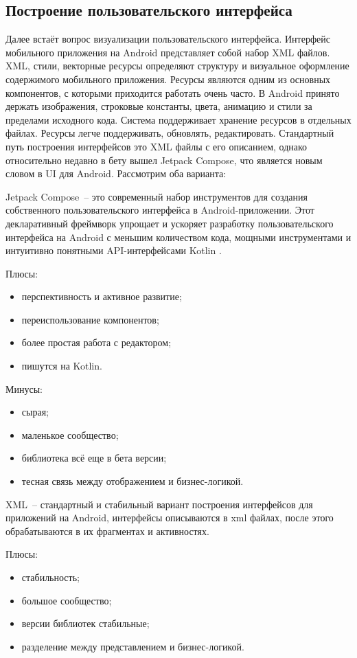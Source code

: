 \subsection{Построение пользовательского интерфейса}
Далее встаёт вопрос визуализации пользовательского интерфейса. Интерфейс мобильного приложения на Android представляет собой набор XML файлов. 
XML, стили, векторные ресурсы определяют структуру и визуальное оформление содержимого мобильного приложения. Ресурсы являются одним из основных компонентов, с которыми приходится работать очень часто. В Android принято держать изображения, строковые константы, цвета, анимацию и стили за пределами исходного кода. Система поддерживает хранение ресурсов в отдельных файлах. Ресурсы легче поддерживать, обновлять, редактировать. Стандартный путь построения интерфейсов это XML файлы с его описанием, однако относительно недавно в бету вышел Jetpack Compose, что является новым словом в UI для Android. Рассмотрим оба варианта:

Jetpack Compose~-- это современный набор инструментов для создания собственного пользовательского интерфейса в Android-приложении. Этот декларативный фреймворк упрощает и ускоряет разработку пользовательского интерфейса на Android с меньшим количеством кода, мощными инструментами и интуитивно понятными API-интерфейсами Kotlin \cite{web13}.
 
Плюсы:
\begin{itemize}
 \item перспективность и активное развитие;
 \item переиспользование компонентов;
 \item более простая работа с редактором;
 \item пишутся на Kotlin.
\end{itemize}

Минусы:
\begin{itemize}
 \item сырая;
 \item маленькое сообщество;
 \item библиотека всё еще в бета версии;
 \item тесная связь между отображением и бизнес-логикой.
\end{itemize}

XML~-- стандартный и стабильный вариант построения интерфейсов для приложений на Android, интерфейсы описываются в xml файлах, после этого обрабатываются в их фрагментах и активностях.

Плюсы:
\begin{itemize}
 \item стабильность;
 \item большое сообщество;
 \item версии библиотек стабильные;
 \item разделение между представлением и бизнес-логикой.
\end{itemize}

